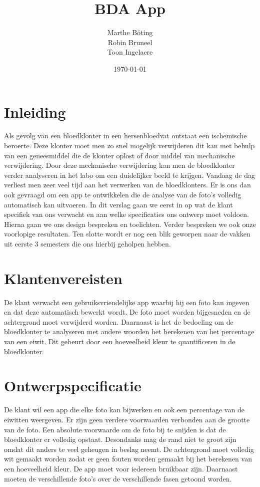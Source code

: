 \documentclass[a4paper,kulak]{kulakarticle}
\date{\today}
\title{BDA App}
\author{Marthe B\"{o}ting\\
	Robin Bruneel\\
	Toon Ingelaere}
\begin{document}
	
	\newpage
	\maketitle
	\tableofcontents
	\newpage
	
	\section*{Inleiding}	
		Als gevolg van een bloedklonter in een hersenbloedvat ontstaat een ischemische beroerte. Deze klonter moet men zo snel mogelijk verwijderen dit kan met behulp van een geneesmiddel die de klonter oplost of door middel van mechanische verwijdering. Door deze mechanische verwijdering kan men de bloedklonter verder analyseren in het labo om een duidelijker beeld te krijgen.
		\newline
		Vandaag de dag verliest men zeer veel tijd aan het verwerken van de bloedklonters. Er is ons dan ook gevraagd om een app te ontwikkelen die de analyse van de foto’s volledig automatisch kan uitvoeren.
		\newline
		In dit verslag gaan we eerst in op wat de klant specifiek van ons verwacht en aan welke specificaties ons ontwerp moet voldoen. Hierna gaan we ons design bespreken en toelichten. Verder bespreken we ook onze voorlopige resultaten. Ten slotte wordt er nog een blik geworpen naar de vakken uit eerste 3 semesters die ons hierbij geholpen hebben.
	
	\section{Klantenvereisten}
		De klant verwacht een gebruiksvriendelijke app waarbij hij een foto kan ingeven en dat deze automatisch bewerkt wordt. De foto moet  worden bijgesneden en de achtergrond moet verwijderd worden. Daarnaast is het de bedoeling om de bloedklonter te analyseren met andere woorden het berekenen van het percentage van een eiwit. Dit gebeurt door een hoeveelheid kleur te quantificeren in de bloedklonter. 
	
	\section{Ontwerpspecificatie}
		De klant wil een app die elke foto kan bijwerken en ook een percentage van de eiwitten weergeven. Er zijn geen verdere voorwaarden verbonden aan de grootte van de foto. Een absolute voorwaarde om de foto bij te snijden is dat de bloedklonter er volledig opstaat. Desondanks mag de rand niet te groot zijn omdat dit anders te veel geheugen in beslag neemt. De achtergrond moet volledig wit gemaakt worden zodat er geen fouten worden gemaakt bij het berekenen van een hoeveelheid kleur. De app moet voor iedereen bruikbaar zijn. Daarnaast moeten de verschillende foto's over de verschillende fasen getoond worden.
		
\end{document}
